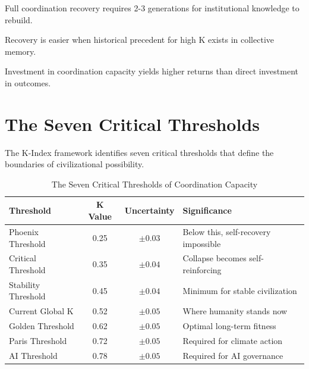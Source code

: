 \documentclass[12pt,letterpaper]{article}
\begin{document}
\begin{lawbox}
Full coordination recovery requires 2-3 generations for institutional knowledge to rebuild.
\end{lawbox}

\begin{lawbox}
Recovery is easier when historical precedent for high K exists in collective memory.
\end{lawbox}

\begin{lawbox}
Investment in coordination capacity yields higher returns than direct investment in outcomes.
\end{lawbox}

\section{The Seven Critical Thresholds}

The K-Index framework identifies seven critical thresholds that define the boundaries of civilizational possibility.

\begin{table}[H]
\centering
\caption{The Seven Critical Thresholds of Coordination Capacity}
\begin{tabular}{lccl}
\toprule
\textbf{Threshold} & \textbf{K Value} & \textbf{Uncertainty} & \textbf{Significance} \\
\midrule
Phoenix Threshold & 0.25 & $\pm 0.03$ & Below this, self-recovery impossible \\
Critical Threshold & 0.35 & $\pm 0.04$ & Collapse becomes self-reinforcing \\
Stability Threshold & 0.45 & $\pm 0.04$ & Minimum for stable civilization \\
Current Global K & 0.52 & $\pm 0.05$ & Where humanity stands now \\
Golden Threshold & 0.62 & $\pm 0.05$ & Optimal long-term fitness \\
Paris Threshold & 0.72 & $\pm 0.05$ & Required for climate action \\
AI Threshold & 0.78 & $\pm 0.05$ & Required for AI governance \\
\bottomrule
\end{tabular}
\end{table}
\end{document}
